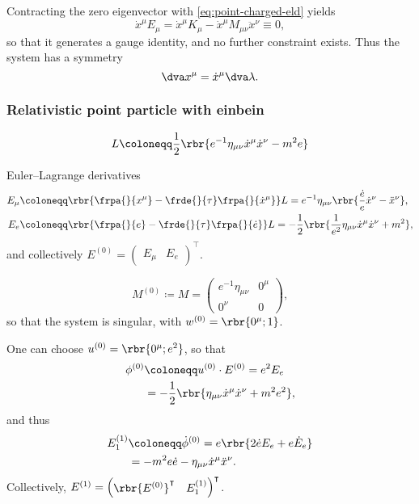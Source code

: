 \documentclass[a4paper,11pt]{article}
\begin{document}
Contracting the zero eigenvector with \cref{eq:point-charged-eld} yields
\begin{equation}
\dot{x}^\mu E_\mu = \dot{x}^\mu K_\mu - \dot{x}^\mu M_{\mu\nu} \ddot{x}^\nu
\equiv 0,
\end{equation}
so that it generates a gauge identity, and no further constraint exists. Thus 
the system has a symmetry
\begin{equation}
\dva x^\mu = \dot{x}^\mu \dva \lambda.
\end{equation}

\subsubsection*{Relativistic point particle with einbein}

\cite[sec.\ 2.1]{Blumenhagen2013}
\begin{equation}
L \coloneqq \frac{1}{2} \rbr{e^{-1}\eta_{\mu\nu}\dot{x}^\mu \dot{x}^\nu - m^2 e}
\label{eq:point-aux-lagrangian}
\end{equation}

Euler--Lagrange derivatives
\begin{align}
E_\mu &\coloneqq \rbr{\frpa{}{x^\mu}-\frde{}{\tau}\frpa{}{\dot{x}^\mu}}L 
= e^{-1}\eta_{\mu\nu} \rbr{\frac{\dot{e}}{e}\dot{x}^\nu - \ddot{x}^\nu}, \\
E_e &\coloneqq \rbr{\frpa{}{e}-\frde{}{\tau}\frpa{}{\dot{e}}}L
= -\frac{1}{2}\rbr{\frac{1}{e^2}\eta_{\mu\nu}\dot{x}^\mu\dot{x}^\nu + m^2},
\end{align}
and collectively $E^{(0)} = \begin{pmatrix} E_\mu & E_e 
\end{pmatrix}^\intercal$.

\begin{equation}
M^{(0)} \coloneqq M =
\begin{pmatrix}
e^{-1}\eta_{\mu\nu} & 0^\mu \\
0^\nu & 0
\end{pmatrix},
\end{equation}
so that the system is singular, with $w^{(0)} = \rbr{0^\mu; 1}$.

One can choose $u^{(0)} = \rbr{0^\mu; e^2}$, so that
\begin{align}
\phi^{(0)} &\coloneqq u^{(0)}\cdot E^{(0)} = e^2 E_e \\
&= -\frac{1}{2}\rbr{\eta_{\mu\nu}\dot{x}^\mu\dot{x}^\nu + m^2 e^2},
\end{align}
and thus
\begin{align}
E^{(1)}_1 &\coloneqq \dot{\phi}^{(0)} = e\rbr{2\dot{e} E_e + e\dot{E}_e} \\
&= - m^2 e\dot{e}-\eta_{\mu\nu}\dot{x}^\mu\ddot{x}^\nu.
\end{align}
Collectively, $E^{(1)} = \begin{pmatrix} \rbr{E^{(0)}}^\intercal & E^{(1)}_1
\end{pmatrix}^\intercal$.
\end{document}
